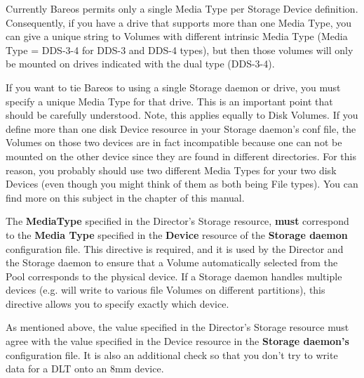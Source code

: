 \begin{description}
Currently Bareos permits only a single Media Type per Storage
Device definition. Consequently, if
you have a drive that supports more than one Media Type, you can
give a unique string to Volumes with different intrinsic Media
Type (Media Type = DDS-3-4 for DDS-3 and DDS-4 types), but then
those volumes will only be mounted on drives indicated with the
dual type (DDS-3-4).

If you want to tie Bareos to using a single Storage daemon or drive, you
must specify a unique Media Type for that drive.  This is an important
point that should be carefully understood.  Note, this applies equally
to Disk Volumes.  If you define more than one disk Device resource in
your Storage daemon's conf file, the Volumes on those two devices are in
fact incompatible because one can not be mounted on the other device
since they are found in different directories.  For this reason, you
probably should use two different Media Types for your two disk Devices
(even though you might think of them as both being File types).  You can
find more on this subject in the  chapter of this manual.

The {\bf MediaType} specified in the Director's Storage resource, {\bf
must} correspond to the {\bf Media Type} specified in the {\bf Device}
resource of the {\bf Storage daemon} configuration file.  This directive
is required, and it is used by the Director and the Storage daemon to
ensure that a Volume automatically selected from the Pool corresponds to
the physical device.  If a Storage daemon handles multiple devices (e.g.
will write to various file Volumes on different partitions), this
directive allows you to specify exactly which device.

As mentioned above, the value specified in the Director's Storage
resource must agree with the value specified in the Device resource in
the {\bf Storage daemon's} configuration file.  It is also an additional
check so that you don't try to write data for a DLT onto an 8mm device.


\end{description}
